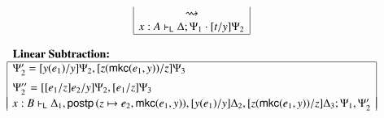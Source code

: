 \documentclass{lmcs}
\newcommand{\DualLNLLogicnt}[1]{\mathit{#1}}
\newcommand{\DualLNLLogicmv}[1]{\mathit{#1}}
\newcommand{\DualLNLLogicsym}[1]{#1}
\begin{document}
\begin{figure}
\begin{mdframed}
\begin{center}
\begin{math}
\begin{array}{c}
\begin{array}{lll}
\begin{array}{|c|}
            \rightsquigarrow\\
             \DualLNLLogicmv{x}  :  \DualLNLLogicnt{A}  \vdash_{\mathsf{L} }  \Delta ; \Psi_{{\mathrm{1}}}  \cdot  \DualLNLLogicsym{[}  \DualLNLLogicnt{t}  \DualLNLLogicsym{/}  \DualLNLLogicmv{y}  \DualLNLLogicsym{]}  \Psi_{{\mathrm{2}}} \\
            \hline
          \end{array}
        \end{array}\\
        \\
        \begin{array}{|c|}
          \multicolumn{1}{l}{\textbf{Linear Subtraction:}}\\
          \hline
          \multicolumn{1}{|l|}{\Psi'_{{\mathrm{2}}} = \DualLNLLogicsym{[}  \DualLNLLogicmv{y}  \DualLNLLogicsym{(}  \DualLNLLogicnt{e_{{\mathrm{1}}}}  \DualLNLLogicsym{)}  \DualLNLLogicsym{/}  \DualLNLLogicmv{y}  \DualLNLLogicsym{]}  \Psi_{{\mathrm{2}}}  \DualLNLLogicsym{,}  \DualLNLLogicsym{[}  \DualLNLLogicmv{z}  \DualLNLLogicsym{(}   \mathsf{mkc}( \DualLNLLogicnt{e_{{\mathrm{1}}}} , \DualLNLLogicmv{y} )   \DualLNLLogicsym{)}  \DualLNLLogicsym{/}  \DualLNLLogicmv{z}  \DualLNLLogicsym{]}  \Psi_{{\mathrm{3}}}}\\[5px]
          \multicolumn{1}{|l|}{\Psi''_{{\mathrm{2}}} = \DualLNLLogicsym{[}  \DualLNLLogicsym{[}  \DualLNLLogicnt{e_{{\mathrm{1}}}}  \DualLNLLogicsym{/}  \DualLNLLogicmv{z}  \DualLNLLogicsym{]}  \DualLNLLogicnt{e_{{\mathrm{2}}}}  \DualLNLLogicsym{/}  \DualLNLLogicmv{y}  \DualLNLLogicsym{]}  \Psi_{{\mathrm{2}}}  \DualLNLLogicsym{,}  \DualLNLLogicsym{[}  \DualLNLLogicnt{e_{{\mathrm{1}}}}  \DualLNLLogicsym{/}  \DualLNLLogicmv{z}  \DualLNLLogicsym{]}  \Psi_{{\mathrm{3}}}}\\
          \\[-10px]
           \DualLNLLogicmv{x}  :  \DualLNLLogicnt{B}  \vdash_{\mathsf{L} }  \Delta_{{\mathrm{1}}}  \DualLNLLogicsym{,}   \mathsf{postp}\,( \DualLNLLogicmv{z}  \mapsto  \DualLNLLogicnt{e_{{\mathrm{2}}}} ,   \mathsf{mkc}( \DualLNLLogicnt{e_{{\mathrm{1}}}} , \DualLNLLogicmv{y} )  )   \DualLNLLogicsym{,}  \DualLNLLogicsym{[}  \DualLNLLogicmv{y}  \DualLNLLogicsym{(}  \DualLNLLogicnt{e_{{\mathrm{1}}}}  \DualLNLLogicsym{)}  \DualLNLLogicsym{/}  \DualLNLLogicmv{y}  \DualLNLLogicsym{]}  \Delta_{{\mathrm{2}}}  \DualLNLLogicsym{,}  \DualLNLLogicsym{[}  \DualLNLLogicmv{z}  \DualLNLLogicsym{(}   \mathsf{mkc}( \DualLNLLogicnt{e_{{\mathrm{1}}}} , \DualLNLLogicmv{y} )   \DualLNLLogicsym{)}  \DualLNLLogicsym{/}  \DualLNLLogicmv{z}  \DualLNLLogicsym{]}  \Delta_{{\mathrm{3}}} ; \Psi_{{\mathrm{1}}}  \DualLNLLogicsym{,}  \Psi'_{{\mathrm{2}}} \\

\end{array}
\end{array}
\end{math}
\end{center}
\end{mdframed}
\end{figure}
\end{document}
